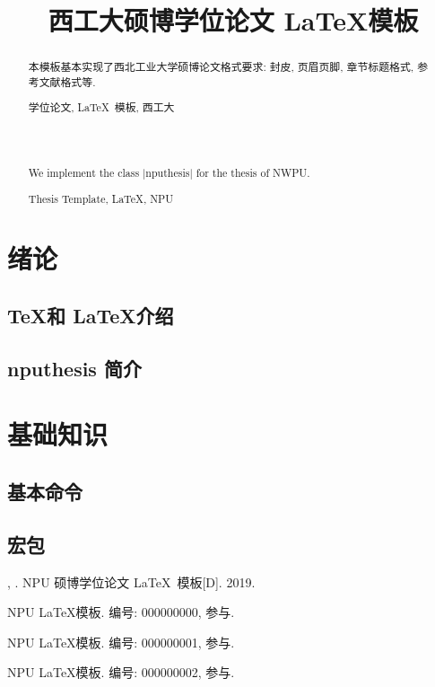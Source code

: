 \documentclass[twoside, UTF8, phd, dbr, AutoFakeBold]{nputhesis}
\title[\LaTeX\ Template of NPU Thesis]{西工大硕博学位论文 \LaTeX 模板}
\author[\dbr{San Zhang}]{\dbr{张三}}
\begin{document}
\makecover
\frontmatter
\begin{abstract}

  本模板基本实现了西北工业大学硕博论文格式要求: 封皮, 页眉页脚, 章节标题格式, 参考文献格式等.

  \begin{keywords}
    学位论文, \LaTeX\ 模板, 西工大
  \end{keywords}
\end{abstract}
\begin{Abstract}
  We implement the class |nputhesis| for the thesis of NWPU.
  \begin{Keywords}
    Thesis Template, \LaTeX, NPU
  \end{Keywords}
\end{Abstract}
\tableofcontents
\printnomenclature
\mainmatter
\chapter{绪论}
\section{\TeX 和 \LaTeX 介绍}
\section{nputhesis 简介}
\chapter{基础知识}
\section{基本命令}
\section{宏包}
\backmatter
\printbibliography             %


\Thanks     %

\Work
\papersection  %

\begin{npulist}
  \item {\bf {}}, . NPU 硕博学位论文 \LaTeX\ 模板[D]. 2019.
\end{npulist}

\researchsection %
\begin{npulist}
  \item NPU \LaTeX 模板.   编号: 000000000, 参与.
  \item NPU \LaTeX 模板.   编号: 000000001, 参与.
  \item NPU \LaTeX 模板.   编号: 000000002, 参与.
\end{npulist}
\statement
\end{document}
